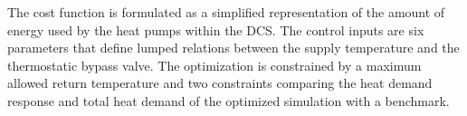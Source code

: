 The cost function is formulated as a simplified representation of the amount of energy used by the heat pumps within the DCS. The control inputs are six parameters that define lumped relations between the supply temperature and the thermostatic bypass valve. The optimization is constrained by a maximum allowed return temperature and two constraints comparing the heat demand response and total heat demand of the optimized simulation with a benchmark. 
